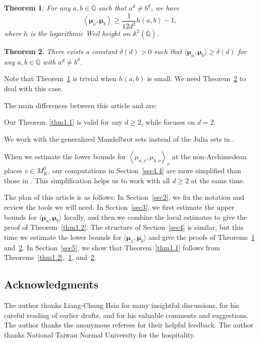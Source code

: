 \documentclass[10pt,a4paper]{amsart}
\numberwithin{equation}{section}
\theoremstyle{plain}
\newtheorem{thm}{Theorem}[section]
\theoremstyle{definition}
\theoremstyle{remark}
\newcommand{\A}{\mathbb A}
\newcommand{\Q}{\mathbb Q}
\renewcommand{\bar}{\overline}
\begin{document}
\begin{thm}\label{thm1.3}
  For any $a,b\in\bar{\Q}$ such that $a^{d}\neq b^{d}$,
we have
\[
\left\langle \boldsymbol{\mu}_{a},\boldsymbol{\mu}_{b}\right\rangle \geq\frac{1}{12d^{2}}h(a,b)-1,
\]
where $h$ is the logarithmic Weil height on $\A^{2}(\bar{\Q})$.
\end{thm}

\begin{thm} \label{thm1.4}
  There exists a constant $\delta(d)>0$ such that $\langle \boldsymbol{\mu}_{a},\boldsymbol{\mu}_{b}\rangle \geq\delta(d)$
for any $a,b\in\bar{\Q}$ with $a^{d}\neq b^{d}$.
\end{thm}

Note that Theorem~\ref{thm1.3} is trivial when $h(a,b)$ is small.
We need Theorem~\ref{thm1.4} to deal with this case.

The main differences between this article and \cite{DKY2} are:
\begin{enumerate*}\item
Our Theorem~\ref{thm1.1} is valid for any $d\geq2$, while
\cite[Theorem 1.1]{DKY2} focuses on $d=2$. \item We work with the
generalized Mandelbrot sets instead of the Julia sets in
\cite{DKY2}. \item When we estimate the lower bounds for $\left\langle
\mu_{a,v},\mu_{b,v}\right\rangle _{v}$ at the non-Archimedean places
$v\in M_{K}^{0}$, our computations in Section~\ref{sec4.4} are more
simplified than those in \cite[Sections 5 and~6]{DKY2}.  This
simplification helps us to work with all $d\geq2$ at the same
time.\end{enumerate*}

The plan of this article is as follows: In Section~\ref{sec2}, we fix
the notation and review the tools we will need. In Section~\ref{sec3},
we first estimate the upper bounds for $\langle
\boldsymbol{\mu}_{a},\boldsymbol{\mu}_{b}\rangle $ locally, and then
we combine the local estimates to give the proof of
Theorem~\ref{thm1.2}. The structure of Section~\ref{sec4} is similar,
but this time we estimate the lower bounds for $\langle
\boldsymbol{\mu}_{a},\boldsymbol{\mu}_{b}\rangle $ and give the proofs
of Theorems~\ref{thm1.3} and~\ref{thm1.4}. In Section~\ref{sec5}, we
show that Theorem~\ref{thm1.1} follows from
Theorems~\ref{thm1.2},~\ref{thm1.3}, and~\ref{thm1.4}.


\subsection*{Acknowledgments} The author thanks Liang-Chung Hsia for
many insightful discussions, for his careful reading of earlier drafts,
and for his valuable comments and suggestions. The author thanks the
anonymous referees for their helpful feedback. The author thanks National
Taiwan Normal University for the hospitality.
\end{document}
